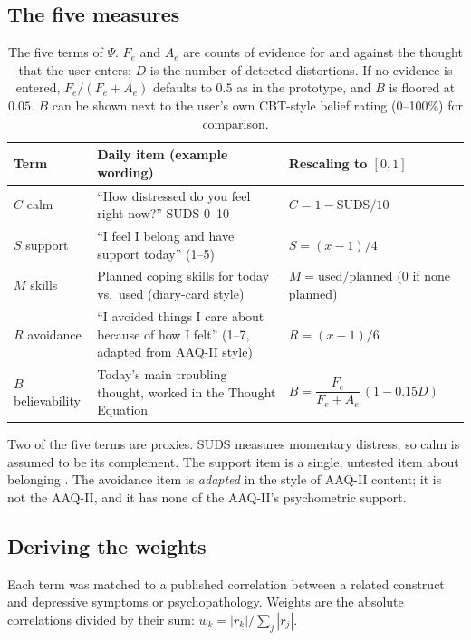 \documentclass[11pt]{article}
\begin{document}
\subsection{The five measures}
\begin{table}[h]
\centering\small
\begin{tabular}{@{}l p{6.2cm} p{5.4cm}@{}}
\toprule
Term & Daily item (example wording) & Rescaling to $[0,1]$\\
\midrule
$C$ calm & ``How distressed do you feel right now?'' SUDS 0--10 & $C = 1 - \text{SUDS}/10$\\
$S$ support & ``I feel I belong and have support today'' (1--5) & $S = (x-1)/4$\\
$M$ skills & Planned coping skills for today vs.\ used (diary-card style) & $M = \text{used}/\text{planned}$ (0 if none planned)\\
$R$ avoidance & ``I avoided things I care about because of how I felt'' (1--7, adapted from AAQ-II style) & $R = (x-1)/6$\\
$B$ believability & Today's main troubling thought, worked in the Thought Equation & $B = \dfrac{F_e}{F_e + A_e}\,(1 - 0.15D)$\\
\bottomrule
\end{tabular}
\caption{The five terms of $\Psi$. $F_e$ and $A_e$ are counts of evidence for and against the thought that the user enters; $D$ is the number of detected distortions. If no evidence is entered, $F_e/(F_e+A_e)$ defaults to $0.5$ as in the prototype, and $B$ is floored at $0.05$. $B$ can be shown next to the user's own CBT-style belief rating (0--100\%) for comparison.}
\label{tab:measures}
\end{table}
Two of the five terms are proxies. SUDS measures momentary distress, so calm is assumed to be its complement. The support item is a single, untested item about belonging \citep[a construct with a long research history; see][]{baumeister1995}. The avoidance item is \emph{adapted} in the style of AAQ-II content; it is not the AAQ-II, and it has none of the AAQ-II's psychometric support.

\subsection{Deriving the weights}
Each term was matched to a published correlation between a related construct and depressive symptoms or psychopathology. Weights are the absolute correlations divided by their sum: $w_k = |r_k| / \sum_j |r_j|$.
\end{document}
